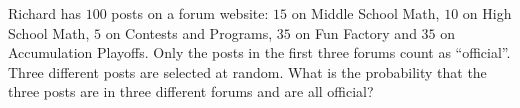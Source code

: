 Richard has $100$ posts on a forum website: $15$ on Middle School Math, $10$ on High School Math, $5$ on Contests and Programs, $35$ on Fun Factory and $35$ on Accumulation Playoffs. Only the posts in the first three forums count as ``official''. Three different posts are selected at random. What is the probability that the three posts are in three different forums and are all official?
